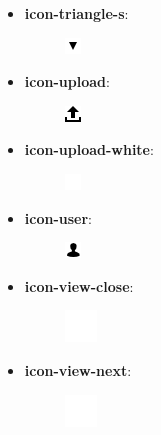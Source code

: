 \documentclass[letterpaper,10pt,english]{sphinxmanual}
\begin{document}
\begin{itemize}
\begin{description}
\end{description}

\item {} \begin{description}
\item[{\textbf{icon-triangle-s}:}] \leavevmode
\includegraphics{triangle-s.png}

\end{description}

\item {} \begin{description}
\item[{\textbf{icon-upload}:}] \leavevmode
\includegraphics{upload.png}

\end{description}

\item {} \begin{description}
\item[{\textbf{icon-upload-white}:}] \leavevmode
\includegraphics{upload-white.png}

\end{description}

\item {} \begin{description}
\item[{\textbf{icon-user}:}] \leavevmode
\includegraphics{user.png}

\end{description}

\item {} \begin{description}
\item[{\textbf{icon-view-close}:}] \leavevmode
\includegraphics{view-close.png}

\end{description}

\item {} \begin{description}
\item[{\textbf{icon-view-next}:}] \leavevmode
\includegraphics{view-next.png}


\end{description}
\end{itemize}
\end{document}

